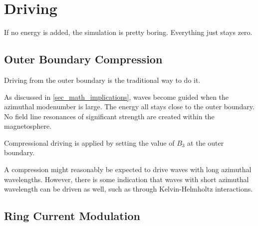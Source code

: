 \section{Driving}
  \label{sec_driving}

If no energy is added, the simulation is pretty boring. Everything just stays zero. 

\subsection{Outer Boundary Compression}

Driving from the outer boundary is the traditional way to do it. 


As discussed in \cref{sec_math_implications}, \Alfven waves become guided when the azimuthal modenumber is large. The energy all stays close to the outer boundary. No field line resonances of significant strength are created within the magnetosphere. 


Compressional driving is applied by setting the value of $B_3$ at the outer boundary. 

A compression might reasonably be expected to drive waves with long azimuthal wavelengths. However, there is some indication that waves with short azimuthal wavelength can be driven as well, such as through Kelvin-Helmholtz interactions. 


\subsection{Ring Current Modulation}


